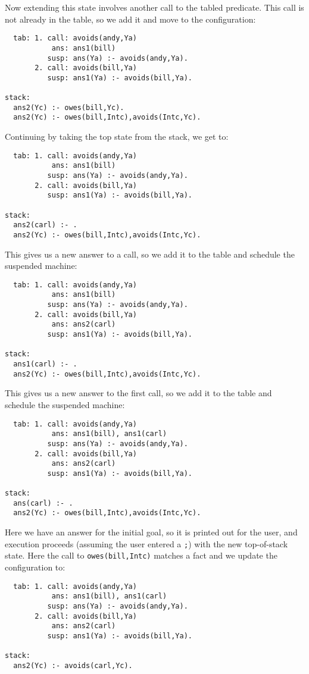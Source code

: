 Now extending this state involves another call to the tabled
predicate.  This call is not already in the table, so we add it and
move to the configuration:
\begin{verbatim}
  tab: 1. call: avoids(andy,Ya)
           ans: ans1(bill)
          susp: ans(Ya) :- avoids(andy,Ya).
       2. call: avoids(bill,Ya)
          susp: ans1(Ya) :- avoids(bill,Ya).

stack:
  ans2(Yc) :- owes(bill,Yc).
  ans2(Yc) :- owes(bill,Intc),avoids(Intc,Yc).
\end{verbatim}
Continuing by taking the top state from the stack, we get to:
\begin{verbatim}
  tab: 1. call: avoids(andy,Ya)
           ans: ans1(bill)
          susp: ans(Ya) :- avoids(andy,Ya).
       2. call: avoids(bill,Ya)
          susp: ans1(Ya) :- avoids(bill,Ya).

stack:
  ans2(carl) :- .
  ans2(Yc) :- owes(bill,Intc),avoids(Intc,Yc).
\end{verbatim}
This gives us a new answer to a call, so we add it to the table and
schedule the suspended machine:
\begin{verbatim}
  tab: 1. call: avoids(andy,Ya)
           ans: ans1(bill)
          susp: ans(Ya) :- avoids(andy,Ya).
       2. call: avoids(bill,Ya)
           ans: ans2(carl)
          susp: ans1(Ya) :- avoids(bill,Ya).

stack:
  ans1(carl) :- .
  ans2(Yc) :- owes(bill,Intc),avoids(Intc,Yc).
\end{verbatim}
This gives us a new answer to the first call, so we add it to the
table and schedule the suspended machine:
\begin{verbatim}
  tab: 1. call: avoids(andy,Ya)
           ans: ans1(bill), ans1(carl)
          susp: ans(Ya) :- avoids(andy,Ya).
       2. call: avoids(bill,Ya)
           ans: ans2(carl)
          susp: ans1(Ya) :- avoids(bill,Ya).

stack:
  ans(carl) :- .
  ans2(Yc) :- owes(bill,Intc),avoids(Intc,Yc).
\end{verbatim}
Here we have an answer for the initial goal, so it is printed out for
the user, and execution proceeds (assuming the user entered a
\verb|;|) with the new top-of-stack state.  Here the call to 
\verb|owes(bill,Intc)| matches a fact and we update the configuration
to:
\begin{verbatim}
  tab: 1. call: avoids(andy,Ya)
           ans: ans1(bill), ans1(carl)
          susp: ans(Ya) :- avoids(andy,Ya).
       2. call: avoids(bill,Ya)
           ans: ans2(carl)
          susp: ans1(Ya) :- avoids(bill,Ya).

stack:
  ans2(Yc) :- avoids(carl,Yc).
\end{verbatim}
